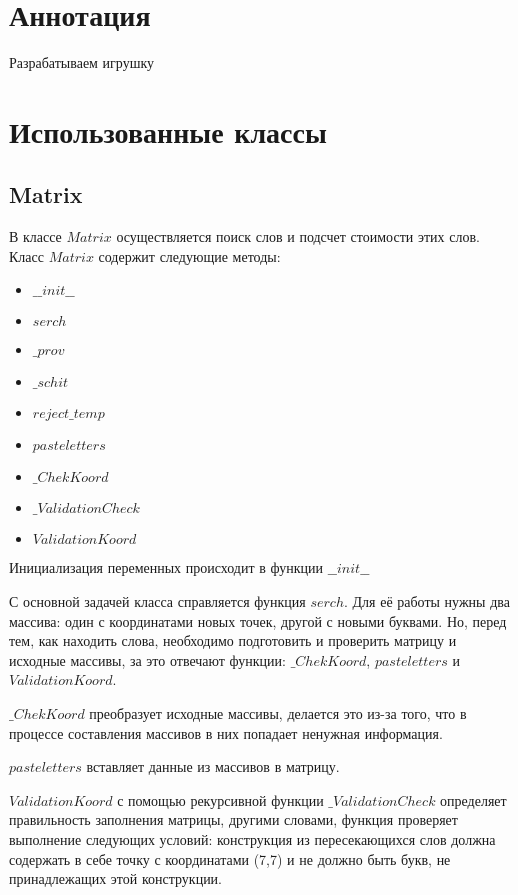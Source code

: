 \documentclass[a4paper,14pt]{article}
\begin{document}

\tableofcontents
\pagebreak
\section{Аннотация}
	Разрабатываем игрушку
	\pagebreak

\section{Использованные классы}
	\subsection{Matrix}
	В классе $Matrix$ осуществляется поиск слов и подсчет стоимости этих слов. Класс $Matrix$ содержит следующие методы: 
	
	\begin {itemize}
		\item$\_\_init\_\_$
		\item $serch$	
		
		\item $\_prov$
		\item $\_schit$
		\item $reject\_temp$
		
		\item $pasteletters$
		\item $\_ChekKoord$
		\item $\_ValidationCheck$	
		\item $ValidationKoord$
	\end {itemize}
	
	Инициализация переменных происходит в функции $\_\_init\_\_$
	
	С основной задачей класса справляется функция $serch$. Для её работы нужны два массива: один с координатами новых точек, другой с новыми буквами. Но, перед тем, как находить слова, необходимо подготовить и проверить матрицу и исходные массивы, за это отвечают функции: $\_ChekKoord$, $pasteletters$ и $ValidationKoord$.
	
	$\_ChekKoord$ преобразует исходные массивы, делается это из-за того, что в процессе составления массивов в них попадает ненужная информация.
	
	$pasteletters$ вставляет данные из массивов в матрицу.
	
	$ValidationKoord$ с помощью рекурсивной функции $\_ValidationCheck$ определяет правильность заполнения матрицы, другими словами, функция проверяет выполнение следующих условий: конструкция из пересекающихся слов должна содержать в себе точку с координатами (7,7) и не должно быть букв, не принадлежащих этой конструкции.
	
\end{document}
